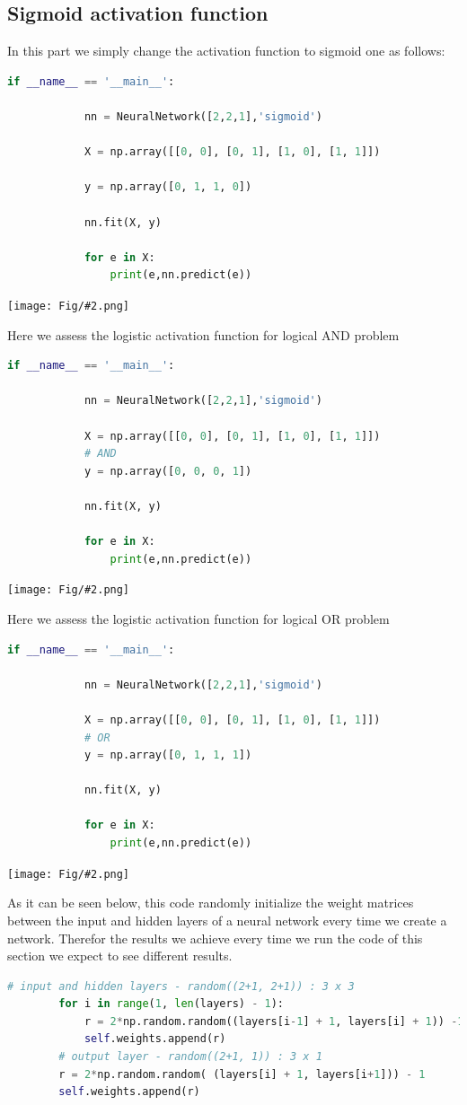 \documentclass[]{article}
\newcommand{\pict}[2]{\begin{center}
		\texttt{[image: Fig/\#2.png]}
\end{center}}
\begin{document}
	\subsection{Sigmoid activation function}
	In this part we simply change the activation function to sigmoid one as follows:
	\begin{lstlisting}[language=python]
		if __name__ == '__main__':
		
			nn = NeuralNetwork([2,2,1],'sigmoid')
			
			X = np.array([[0, 0], [0, 1], [1, 0], [1, 1]])
			
			y = np.array([0, 1, 1, 0])
			
			nn.fit(X, y)
			
			for e in X:
				print(e,nn.predict(e))
	\end{lstlisting}
	\pict{0.5}{F11}
	Here we assess the logistic activation function for logical AND problem
	\begin{lstlisting}[language=python]
		if __name__ == '__main__':
		
			nn = NeuralNetwork([2,2,1],'sigmoid')
			
			X = np.array([[0, 0], [0, 1], [1, 0], [1, 1]])
			# AND
			y = np.array([0, 0, 0, 1])
			
			nn.fit(X, y)
			
			for e in X:
				print(e,nn.predict(e))
	\end{lstlisting}
	\pict{0.5}{F12}
	Here we assess the logistic activation function for logical OR problem
	\begin{lstlisting}[language=python]
		if __name__ == '__main__':
		
			nn = NeuralNetwork([2,2,1],'sigmoid')
			
			X = np.array([[0, 0], [0, 1], [1, 0], [1, 1]])
			# OR
			y = np.array([0, 1, 1, 1])
			
			nn.fit(X, y)
			
			for e in X:
				print(e,nn.predict(e))
	\end{lstlisting}
	\pict{0.5}{F13}
	As it can be seen below, this code randomly initialize the weight matrices between the input and hidden layers of a neural network every time we create a network. Therefor the results we achieve every time we run the code of this section we expect to see different results.
	\begin{lstlisting}[language=python]
		# input and hidden layers - random((2+1, 2+1)) : 3 x 3
		for i in range(1, len(layers) - 1):
			r = 2*np.random.random((layers[i-1] + 1, layers[i] + 1)) -1
			self.weights.append(r)
		# output layer - random((2+1, 1)) : 3 x 1
		r = 2*np.random.random( (layers[i] + 1, layers[i+1])) - 1
		self.weights.append(r)
	\end{lstlisting}
\end{document}

